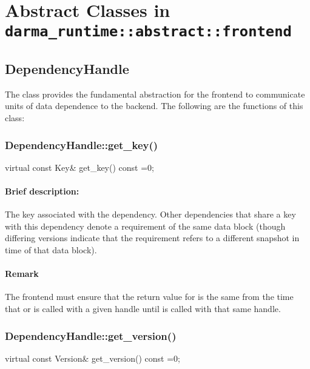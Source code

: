 
\section{Abstract Classes in {\tt darma\_runtime::abstract::frontend}}

\subsection{{DependencyHandle}}
The class  provides the fundamental abstraction for the frontend to communicate units of
data dependence to the backend. The following are the functions of this class:

\subsubsection{DependencyHandle::get\_key()}
\begin{CppCode}
    virtual const Key&
    get_key() const =0;
\end{CppCode}

\paragraph{Brief description:} The key associated with the dependency.
       Other dependencies that share a key with this dependency denote a requirement of the same
       data block (though differing versions indicate that the requirement refers to a different
       snapshot in time of that data block).
     
\paragraph{Remark} The frontend must ensure that the return value for  is the same from the
      time that  or  is called with a given
       handle until  is called with that same handle.


\subsubsection{DependencyHandle::get\_version()}
\begin{CppCode}
    virtual const Version&
    get_version() const =0;
\end{CppCode}

